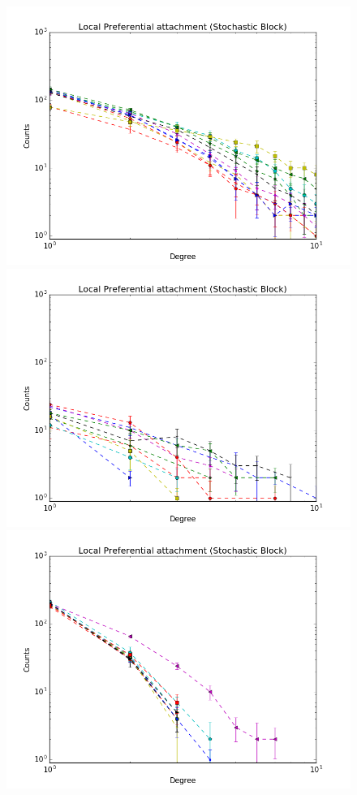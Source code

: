 \begin{figure}[ht]
	\endminipage
		\vspace{-0.29cm}
	\includegraphics[scale=0.27]{img/expe/4_mmsb/figure_2}
	\endminipage
	\includegraphics[scale=0.27]{img/expe/5_mmsb/figure_2} 
	\endminipage
	\includegraphics[scale=0.27]{img/expe/6_mmsb/figure_2}

\end{figure}
